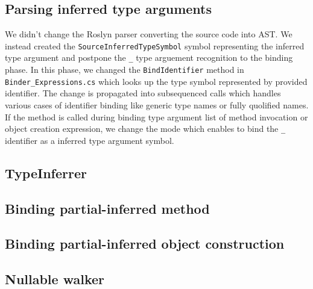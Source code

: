 \subsection{Parsing inferred type arguments}

We didn't change the Roslyn parser converting the source code into \ac{AST}.
We instead created the \texttt{SourceInferredTypeSymbol} symbol representing the inferred type argument and postpone the \texttt{\_} type arguement recognition to the binding phase.
In this phase, we changed the \texttt{BindIdentifier} method in \texttt{Binder\_Expressions.cs} which looks up the type symbol represented by provided identifier.
The change is propagated into subsequenced calls which handles various cases of identifier binding like generic type names or fully quolified names. 
If the method is called during binding type argument list of method invocation or object creation expression, we change the mode which enables to bind the \texttt{\_} identifier as a inferred type argument symbol.

\subsection{TypeInferrer}


\subsection{Binding partial-inferred method}


\subsection{Binding partial-inferred object construction}


\subsection{Nullable walker}

